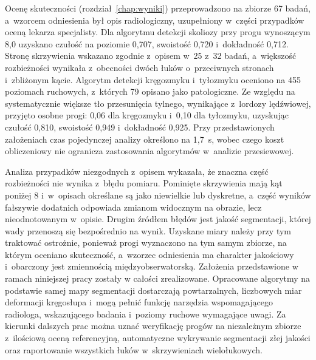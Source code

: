 Ocenę skuteczności (rozdział~\ref{chap:wyniki}) przeprowadzono na zbiorze 67 badań, a~wzorcem odniesienia był opis radiologiczny, uzupełniony w~części przypadków oceną lekarza specjalisty.
Dla algorytmu detekcji skoliozy przy progu wynoszącym 8,0\degree{} uzyskano czułość na poziomie 0,707, swoistość 0,720 i~dokładność 0,712.
Stronę skrzywienia wskazano zgodnie z~opisem w~25 z~32 badań, a~większość rozbieżności wynikała z~obecności dwóch łuków o~przeciwnych stronach i~zbliżonym kącie.
Algorytm detekcji kręgozmyku i~tyłozmyku oceniono na 455 poziomach ruchowych, z~których 79 opisano jako patologiczne.
Ze względu na systematycznie większe tło przesunięcia tylnego, wynikające z~lordozy lędźwiowej, przyjęto osobne progi: 0,06 dla kręgozmyku i~0,10 dla tyłozmyku, uzyskując czułość 0,810, swoistość 0,949 i~dokładność 0,925.
Przy przedstawionych założeniach czas pojedynczej analizy określono na 1,7~s, wobec czego koszt obliczeniowy nie ogranicza zastosowania algorytmów w~analizie przesiewowej.

Analiza przypadków niezgodnych z~opisem wykazała, że znaczna część rozbieżności nie wynika z~błędu pomiaru.
Pominięte skrzywienia mają kąt poniżej 8\degree{} i~w~opisach określane są jako niewielkie lub dyskretne, a~część wyników fałszywie dodatnich odpowiada zmianom widocznym na obrazie, lecz nieodnotowanym w~opisie.
Drugim źródłem błędów jest jakość segmentacji, której wady przenoszą się bezpośrednio na wynik.
Uzyskane miary należy przy tym traktować ostrożnie, ponieważ progi wyznaczono na tym samym zbiorze, na którym oceniano skuteczność, a~wzorzec odniesienia ma charakter jakościowy i~obarczony jest zmiennością międzyobserwatorską.
Założenia przedstawione w ramach niniejszej pracy zostały w całości zrealizowane.
Opracowane algorytmy na podstawie samej mapy segmentacji dostarczają powtarzalnych, liczbowych miar deformacji kręgosłupa i~mogą pełnić funkcję narzędzia wspomagającego radiologa, wskazującego badania i~poziomy ruchowe wymagające uwagi.
Za kierunki dalszych prac można uznać weryfikację progów na niezależnym zbiorze z~ilościową oceną referencyjną, automatyczne wykrywanie segmentacji złej jakości oraz raportowanie wszystkich łuków w~skrzywieniach wielołukowych.
